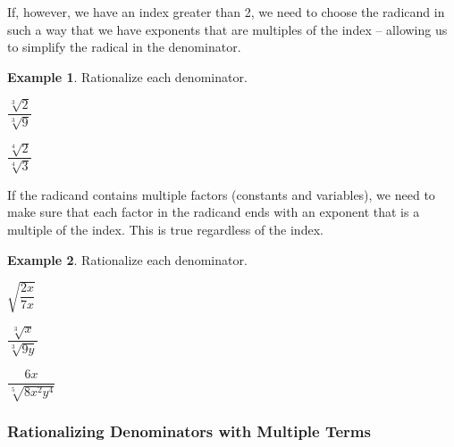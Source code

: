 \documentclass[addpoints,12pt]{exam}
\theoremstyle{definition}
\newtheorem{example}{Example}[subsection]
\begin{document}
\newpage

If, however, we have an index greater than 2, we need to choose the radicand in such a way that we have exponents that are multiples of the index -- allowing us to simplify the radical in the denominator.

\vspace{.25in}

\begin{example}
Rationalize each denominator.
\begin{enumerate}
\begin{minipage}{.5\textwidth}
\item $\dfrac{\sqrt[3]{2}}{\sqrt[3]{9}}$
\end{minipage}%
\begin{minipage}{.5\textwidth}
\item $\dfrac{\sqrt[4]{2}}{\sqrt[4]{3}}$
\end{minipage}%
\end{enumerate}
\end{example}

\vspace{1.5in}

If the radicand contains multiple factors (constants and variables), we need to make sure that each factor in the radicand ends with an exponent that is a multiple of the index. This is true regardless of the index.

\vspace{.25in}

\begin{example}
Rationalize each denominator.
\begin{enumerate}
\begin{minipage}{.33\textwidth}
\item $\sqrt{\dfrac{2x}{7x}}$
\end{minipage}%
\begin{minipage}{.33\textwidth}
\item $\dfrac{\sqrt[3]{x}}{\sqrt[3]{9y}}$
\end{minipage}%
\begin{minipage}{.33\textwidth}
\item $\dfrac{6x}{\sqrt[5]{8x^2y^4}}$
\end{minipage}%
\end{enumerate}
\end{example}

\newpage

\subsubsection*{Rationalizing Denominators with Multiple Terms}
\end{document}
